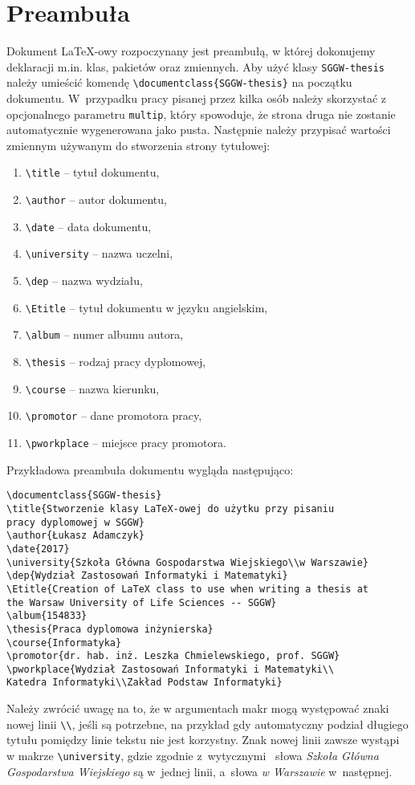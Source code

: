 \documentclass{SGGW-thesis}
\begin{document}
\section{Preambuła}
Dokument \LaTeX-owy rozpoczynany jest preambułą, w której dokonujemy deklaracji m.in. klas, pakietów oraz zmiennych. Aby użyć klasy {\tt SGGW-thesis} należy umieścić komendę
\verb|\documentclass{SGGW-thesis}| na początku dokumentu. W~przypadku pracy pisanej przez kilka osób należy skorzystać z opcjonalnego parametru \verb|multip|, który
spowoduje, że strona druga nie zostanie automatycznie wygenerowana jako pusta.  Następnie należy przypisać wartości zmiennym używanym do stworzenia strony tytułowej:
\begin{enumerate}[label=\alph*.]
\item{\verb|\title| -- tytuł dokumentu,}
\item{\verb|\author| -- autor dokumentu,}
\item{\verb|\date|  -- data dokumentu,}
\item{\verb|\university| -- nazwa uczelni,}
\item{\verb|\dep| -- nazwa wydziału,}
\item{\verb|\Etitle| -- tytuł dokumentu w języku angielskim,}
\item{\verb|\album| -- numer albumu autora,}
\item{\verb|\thesis| -- rodzaj pracy dyplomowej,}
\item{\verb|\course| -- nazwa kierunku,}
\item{\verb|\promotor| -- dane promotora pracy,}
\item{\verb|\pworkplace| -- miejsce pracy promotora.}
\end{enumerate}
Przykładowa preambuła dokumentu wygląda następująco:
\begin{verbatim}
\documentclass{SGGW-thesis}
\title{Stworzenie klasy LaTeX-owej do użytku przy pisaniu
pracy dyplomowej w SGGW}
\author{Łukasz Adamczyk}
\date{2017}
\university{Szkoła Główna Gospodarstwa Wiejskiego\\w Warszawie}
\dep{Wydział Zastosowań Informatyki i Matematyki}
\Etitle{Creation of LaTeX class to use when writing a thesis at
the Warsaw University of Life Sciences -- SGGW}
\album{154833}
\thesis{Praca dyplomowa inżynierska}
\course{Informatyka}
\promotor{dr. hab. inż. Leszka Chmielewskiego, prof. SGGW}
\pworkplace{Wydział Zastosowań Informatyki i Matematyki\\
Katedra Informatyki\\Zakład Podstaw Informatyki}
\end{verbatim}
Należy zwrócić uwagę na to, że w argumentach makr mogą występować znaki nowej linii \verb|\\|, jeśli są potrzebne, na przykład gdy automatyczny podział długiego tytułu
pomiędzy linie tekstu nie jest korzystny. Znak nowej linii zawsze wystąpi w makrze \verb|\university|, gdzie zgodnie z~wytycznymi~\cite{wymagania} słowa {\em Szkoła Główna
Gospodarstwa Wiejskiego} są w~jednej linii, a~słowa {\em w Warszawie} w~następnej.
\end{document}
